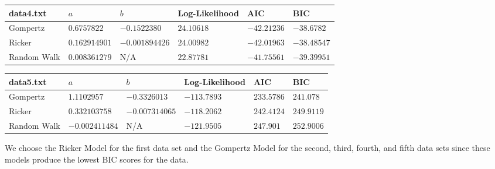 \documentclass{article} %
\theoremstyle{plain}
\numberwithin{equation}{section} %
\numberwithin{figure}{section} %
\numberwithin{table}{section} %
\begin{document}
\begin{table}[ht!]
    \begin{tabular}{||l||l|l|l|l|l||}\hline\hline
        data4.txt   & $a$ & $b$ & Log-Likelihood & AIC & BIC \\\hline\hline
        Gompertz    & $0.6757822$ & $-0.1522380$ & $24.10618$ & $-42.21236$ & $-38.6782$ \\\hline
        Ricker      & $0.162914901$ & $-0.001894426$ & $24.00982$ & $-42.01963$ & $-38.48547$ \\\hline
        Random Walk & $0.008361279$ & N/A & $22.87781$ & $-41.75561$ & $-39.39951$ \\\hline\hline
    \end{tabular}
\end{table}

\begin{table}[ht!]
    \begin{tabular}{||l||l|l|l|l|l||}\hline\hline
        data5.txt   & $a$ & $b$ & Log-Likelihood & AIC & BIC \\\hline\hline
        Gompertz    & $1.1102957$ & $-0.3326013$ & $-113.7893$ & $233.5786$ & $241.078$ \\\hline
        Ricker      & $0.332103758$ & $-0.007314065$ & $-118.2062$ & $242.4124$ & $249.9119$ \\\hline
        Random Walk & $-0.002411484$ & N/A & $-121.9505$ & $247.901$ & $252.9006$ \\\hline\hline
    \end{tabular}
\end{table}

We choose the Ricker Model for the first data set and the Gompertz Model for the second, third, fourth, and fifth data sets since these models produce the lowest BIC scores for the data.
\end{document}
